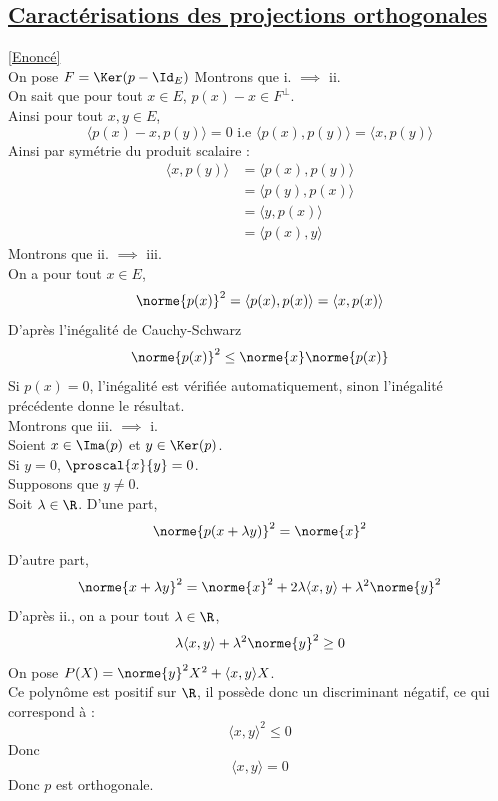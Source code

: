\documentclass[8pt]{book}
\begin{document}
	\subsection{\underline{Caractérisations des projections orthogonales} }
	\label{Caractérisations des projections orthogonales corrigé}
	\textcolor{blue}{\hyperref[Caractérisations des projections orthogonales]{[Enoncé]}}\\
	On pose $F=\Ker(p-\Id_E)$
	Montrons que i. $\implies$ ii.\\
	On sait que pour tout $x\in E$, $p(x)-x\in F^\perp$.\\
	Ainsi pour tout $x,y\in E$, \[\langle p(x)-x,p(y)\rangle=0 \text{ i.e } \langle p(x),p(y)\rangle=\langle x,p(y)\rangle\]
	Ainsi par symétrie du produit scalaire : 
	\begin{align*}
		\langle x,p(y)\rangle&=\langle p(x), p(y)\rangle\\
		&=\langle p(y), p(x)\rangle\\
		&=\langle y,p(x)\rangle\\
		&=\langle p(x), y\rangle
	\end{align*}
	Montrons que ii. $\implies$ iii.\\
	On a pour tout $x\in E$, \[\norme{p(x)}^2=\langle p(x),p(x)\rangle=\langle x, p(x)\rangle\]
	D'après l'inégalité de Cauchy-Schwarz 
	\[\norme{p(x)}^2\leq \norme{x}\norme{p(x)}\]
	Si $p(x)=0$, l'inégalité est vérifiée automatiquement, sinon l'inégalité précédente donne le résultat.\\
	Montrons que iii. $\implies$ i.\\
	Soient $x\in \Ima(p)$ et $y\in\Ker(p)$.\\
	Si $y=0$, $\proscal{x}{y}=0$.\\
	Supposons que $y\ne 0$.\\
	Soit $\lambda\in\R$.
	D'une part, \[\norme{p(x+\lambda y)}^2=\norme{x}^2\]
	D'autre part, \[\norme{x+\lambda y}^2=\norme{x}^2+2\lambda\langle x, y\rangle+\lambda^2\norme{y}^2\]
	D'après ii., on a pour tout $\lambda\in\R$,
	\[\lambda\langle x,y\rangle+\lambda^2\norme{y}^2\geq 0\]
	On pose $P(X)=\norme{y}^2X^2+\langle x,y\rangle X$.\\
	Ce polynôme est positif sur $\R$, il possède donc un discriminant négatif, ce qui correspond à : \[\langle x,y\rangle^2\leq 0\]
	Donc \[\langle x,y\rangle=0\]
	Donc $p$ est orthogonale.
	
\end{document}
